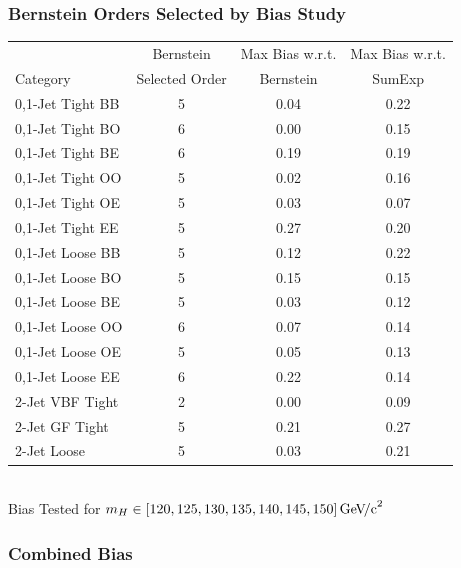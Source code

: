 \documentclass{beamer}
\newcommand{\GeVcc}{\ensuremath{\,\mathrm{Ge\kern -0.1em V\!/c}^2}}
\begin{document}
\begin{frame}
\frametitle{Bernstein Orders Selected by Bias Study}
  \begin{center}
    \scriptsize
    \begin{tabular}{|l|c|c|c|} \hline
                           & Bernstein                & Max Bias w.r.t. & Max Bias w.r.t. \\
Category                  & Selected Order      & Bernstein & SumExp \\ \hline \hline
0,1-Jet Tight BB& 5          &       0.04 &       0.22 \\ \hline
0,1-Jet Tight BO& 6          &       0.00 &       0.15 \\ \hline
0,1-Jet Tight BE& 6          &       0.19 &       0.19 \\ \hline
0,1-Jet Tight OO& 5          &       0.02 &       0.16 \\ \hline
0,1-Jet Tight OE& 5          &       0.03 &       0.07 \\ \hline
0,1-Jet Tight EE& 5          &       0.27 &       0.20 \\ \hline
0,1-Jet Loose BB& 5          &       0.12 &       0.22 \\ \hline
0,1-Jet Loose BO& 5          &       0.15 &       0.15 \\ \hline
0,1-Jet Loose BE& 5          &       0.03 &       0.12 \\ \hline
0,1-Jet Loose OO& 6          &       0.07 &       0.14 \\ \hline
0,1-Jet Loose OE& 5          &       0.05 &       0.13 \\ \hline
0,1-Jet Loose EE& 6          &       0.22 &       0.14 \\ \hline
2-Jet VBF Tight& 2          &       0.00 &       0.09 \\ \hline
2-Jet GF Tight & 5          &       0.21 &       0.27 \\ \hline
2-Jet Loose    & 5          &       0.03 &       0.21 \\ \hline
    \end{tabular}
\\
  \small
    Bias Tested for $m_H \in [120,125,130,135,140,145,150] \GeVcc$
  \end{center}
\end{frame}

\begin{frame}
\frametitle{Combined Bias}
  \begin{center}
  \end{center}
\end{frame}
\end{document}
